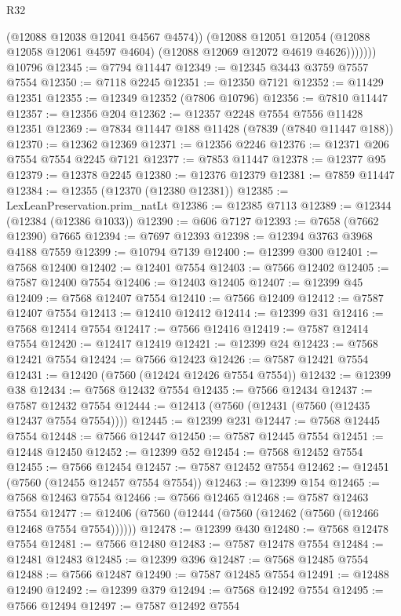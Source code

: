\begin{lexlean}{R32}
\begin{coremodule}
                (@12088 @12038 @12041 @4567 @4574))
              (@12088
                @12051
                @12054
                (@12088 @12058 @12061 @4597 @4604)
                (@12088 @12069 @12072 @4619 @4626)))))))
    @10796
@12345 := @7794 @11447
@12349 := @12345 @3443 @3759 @7557 @7554
@12350 := @7118 @2245
@12351 := @12350 @7121
@12352 := @11429 @12351
@12355 := @12349 @12352 (@7806 @10796)
@12356 := @7810 @11447
@12357 := @12356 @204
@12362 := @12357 @2248 @7554 @7556 @11428 @12351
@12369 := @7834 @11447 @188 @11428 (@7839 (@7840 @11447 @188))
@12370 := @12362 @12369
@12371 := @12356 @2246
@12376 := @12371 @206 @7554 @7554 @2245 @7121
@12377 := @7853 @11447
@12378 := @12377 @95
@12379 := @12378 @2245
@12380 := @12376 @12379
@12381 := @7859 @11447
@12384 := @12355 (@12370 (@12380 @12381))
@12385 := LexLeanPreservation.prim_natLt
@12386 := @12385 @7113
@12389 := @12344 (@12384 (@12386 @1033))
@12390 := @606 @7127
@12393 := @7658 (@7662 @12390) @7665
@12394 := @7697 @12393
@12398 := @12394 @3763 @3968 @4188 @7559
@12399 := @10794 @7139
@12400 := @12399 @300
@12401 := @7568 @12400
@12402 := @12401 @7554
@12403 := @7566 @12402
@12405 := @7587 @12400 @7554
@12406 := @12403 @12405
@12407 := @12399 @45
@12409 := @7568 @12407 @7554
@12410 := @7566 @12409
@12412 := @7587 @12407 @7554
@12413 := @12410 @12412
@12414 := @12399 @31
@12416 := @7568 @12414 @7554
@12417 := @7566 @12416
@12419 := @7587 @12414 @7554
@12420 := @12417 @12419
@12421 := @12399 @24
@12423 := @7568 @12421 @7554
@12424 := @7566 @12423
@12426 := @7587 @12421 @7554
@12431 := @12420 (@7560 (@12424 @12426 @7554 @7554))
@12432 := @12399 @38
@12434 := @7568 @12432 @7554
@12435 := @7566 @12434
@12437 := @7587 @12432 @7554
@12444 := @12413 (@7560 (@12431 (@7560 (@12435 @12437 @7554 @7554))))
@12445 := @12399 @231
@12447 := @7568 @12445 @7554
@12448 := @7566 @12447
@12450 := @7587 @12445 @7554
@12451 := @12448 @12450
@12452 := @12399 @52
@12454 := @7568 @12452 @7554
@12455 := @7566 @12454
@12457 := @7587 @12452 @7554
@12462 := @12451 (@7560 (@12455 @12457 @7554 @7554))
@12463 := @12399 @154
@12465 := @7568 @12463 @7554
@12466 := @7566 @12465
@12468 := @7587 @12463 @7554
@12477 := @12406 (@7560 (@12444 (@7560 (@12462 (@7560 (@12466 @12468 @7554 @7554))))))
@12478 := @12399 @430
@12480 := @7568 @12478 @7554
@12481 := @7566 @12480
@12483 := @7587 @12478 @7554
@12484 := @12481 @12483
@12485 := @12399 @396
@12487 := @7568 @12485 @7554
@12488 := @7566 @12487
@12490 := @7587 @12485 @7554
@12491 := @12488 @12490
@12492 := @12399 @379
@12494 := @7568 @12492 @7554
@12495 := @7566 @12494
@12497 := @7587 @12492 @7554

\end{coremodule}
\end{lexlean}

